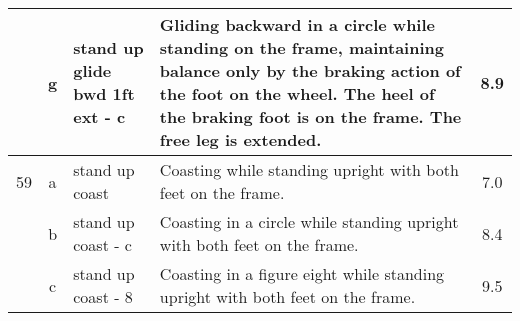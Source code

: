 \begin{longtable}{|r|c|p{4cm}|p{8cm}|c|}
\hline
  & g & stand up glide bwd 1ft ext - c  & Gliding backward in a circle while standing on the frame, maintaining balance only by the braking action of the foot on the wheel. The heel of the braking foot is on the frame. The free leg is extended.  & 8.9 \\ 
\hline
59  & a & stand up coast  & Coasting while standing upright with both feet on the frame.  & 7.0 \\ 
\hline
  & b & stand up coast - c  & Coasting in a circle while standing upright with both feet on the frame.  & 8.4 \\ 
\hline
  & c & stand up coast - 8  & Coasting in a figure eight while standing upright with both feet on the frame.  & 9.5 \\ 
\hline
\end{longtable}
\newpage

